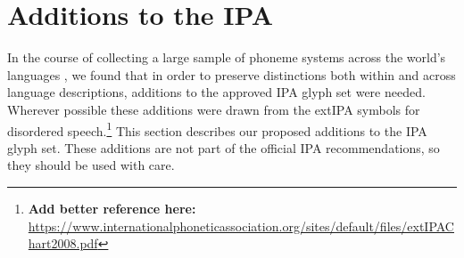 \section{Additions to the IPA}
\label{ipa-additions}

In the course of collecting a large sample of phoneme systems across the world's
languages \citep{Moran2012}, we found that in order to preserve distinctions
both within and across language descriptions, additions to the approved IPA
glyph set were needed. Wherever possible these additions were drawn from the
extIPA symbols for disordered
speech.\footnote{\textbf{Add better reference here: }\url{https://www.internationalphoneticassociation.org/sites/default/files/extIPAChart2008.pdf}}
This section describes our proposed additions to the IPA glyph set. These
additions are not part of the official IPA recommendations, so they should be 
used with care.

